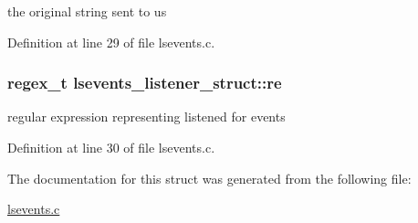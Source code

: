 the original string sent to us 



Definition at line 29 of file lsevents.\-c.

\hypertarget{structlsevents__listener__struct_a60b0f9e188a08e6101c494af89052d3f}{
\subsubsection[{re}]{\setlength{\rightskip}{0pt plus 5cm}regex\-\_\-t lsevents\-\_\-listener\-\_\-struct\-::re}}\label{structlsevents__listener__struct_a60b0f9e188a08e6101c494af89052d3f}


regular expression representing listened for events 



Definition at line 30 of file lsevents.\-c.



The documentation for this struct was generated from the following file\-:\begin{DoxyCompactItemize}
\item 
\hyperlink{lsevents_8c}{lsevents.\-c}\end{DoxyCompactItemize}
